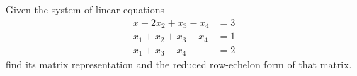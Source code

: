 \begin{problem}
  Given the system of linear equations
  \begin{equation}
    \label{eq:2:1}
    \begin{aligned}
      x-2x_2+x_3-x_4&=3\\
      x_1+x_2+x_3-x_4&=1\\
      x_1+x_3-x_4&=2
    \end{aligned}
  \end{equation}
  find its matrix representation and the reduced row-echelon form of that
  matrix.
\end{problem}
\bigskip\bigskip\bigskip
\bigskip\bigskip\bigskip
\bigskip\bigskip\bigskip
\bigskip\bigskip\bigskip
